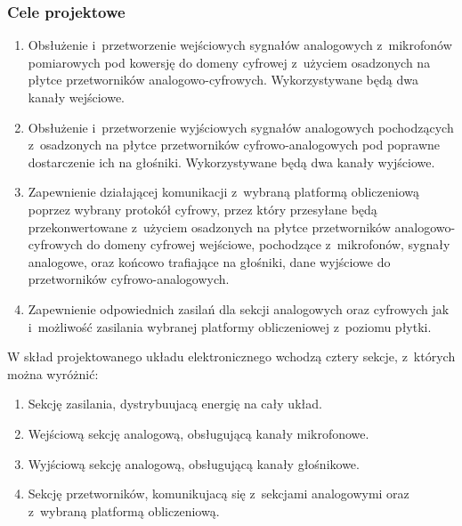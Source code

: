 \subsubsection{Cele projektowe}
\begin{enumerate}

    \item Obsłużenie i~przetworzenie wejściowych sygnałów analogowych
    z~mikrofonów pomiarowych pod kowersję do domeny cyfrowej z~użyciem
    osadzonych na płytce przetworników analogowo-cyfrowych. Wykorzystywane będą
    dwa kanały wejściowe.

    \item Obsłużenie i~przetworzenie wyjściowych sygnałów analogowych
    pochodzących z~osadzonych na płytce przetworników cyfrowo-analogowych pod
    poprawne dostarczenie ich na głośniki. Wykorzystywane będą dwa kanały
    wyjściowe.

    \item Zapewnienie działającej komunikacji z~wybraną platformą obliczeniową
    poprzez wybrany protokół cyfrowy, przez który przesyłane będą
    przekonwertowane z~użyciem osadzonych na płytce przetworników
    analogowo-cyfrowych do domeny cyfrowej wejściowe, pochodzące z~mikrofonów,
    sygnały analogowe, oraz końcowo trafiające na głośniki, dane wyjściowe do
    przetworników cyfrowo-analogowych.

    \item Zapewnienie odpowiednich zasilań dla sekcji analogowych oraz cyfrowych
    jak i~możliwość zasilania wybranej platformy obliczeniowej z~poziomu płytki.

\end{enumerate}

W skład projektowanego układu elektronicznego wchodzą cztery sekcje, z~których
można wyróżnić:

\begin{enumerate}

    \item Sekcję zasilania, dystrybuujacą energię na cały układ.

    \item Wejściową sekcję analogową, obsługującą kanały mikrofonowe.

    \item Wyjściową sekcję analogową, obsługującą kanały głośnikowe.

    \item Sekcję przetworników, komunikujacą się z~sekcjami analogowymi oraz
    z~wybraną platformą obliczeniową.

\end{enumerate}

